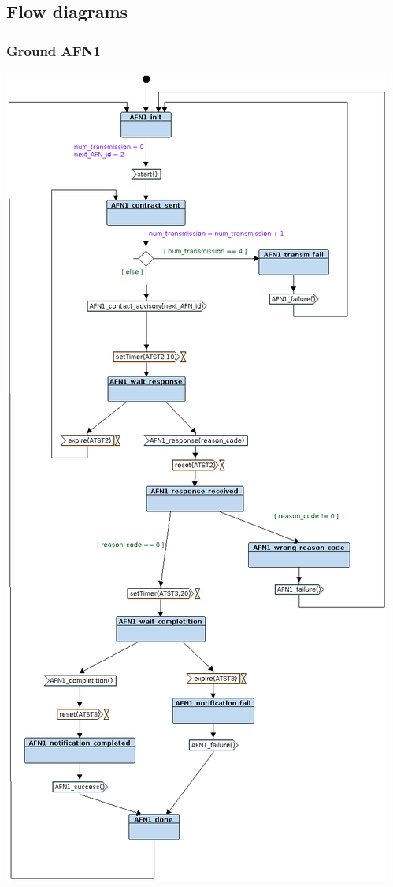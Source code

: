 \documentclass{article}
\begin{document}
\subsection{Flow diagrams}

\subsubsection{Ground AFN1}
\includegraphics[width=\textwidth]{./lab2_06.png}
\end{document}
